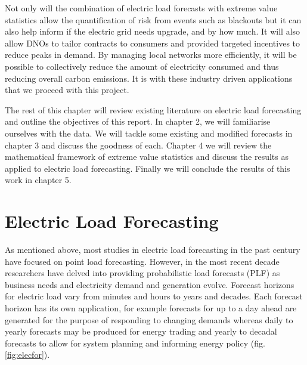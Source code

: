 Not only will the combination of electric load forecasts with extreme value statistics allow the quantification of risk from events such as blackouts but it can also help inform if the electric grid needs upgrade, and by how much. It will also allow DNOs to tailor contracts to consumers and provided targeted incentives to reduce peaks in demand. By managing local networks more efficiently, it will be possible to collectively reduce the amount of electricity consumed and thus reducing overall carbon emissions. It is with these industry driven applications that we proceed with this project.

The rest of this chapter will review existing literature on electric load forecasting and outline the objectives of this report. In chapter 2, we will familiarise ourselves with the data. We will tackle some existing and modified forecasts in chapter 3 and discuss the goodness of each. Chapter 4 we will review the mathematical framework of extreme value statistics and discuss the results as applied to electric load forecasting. Finally we will conclude the results of this work in chapter 5.





\section{Electric Load Forecasting} \label{subsec:litrev}

As mentioned above, most studies in electric load forecasting in the past century have focused on point load forecasting. However, in the most recent decade researchers have delved into providing probabilistic load forecasts (PLF) as business needs and electricity demand and generation evolve. Forecast horizons for electric load vary from minutes and hours to years and decades. Each forecast horizon has its own application, for example forecasts for up to a day ahead are generated for the purpose of responding to changing demands whereas daily to yearly forecasts may be produced for energy trading and yearly to decadal forecasts to allow for system planning and informing energy policy (fig. \ref{fig:elecfor}).

